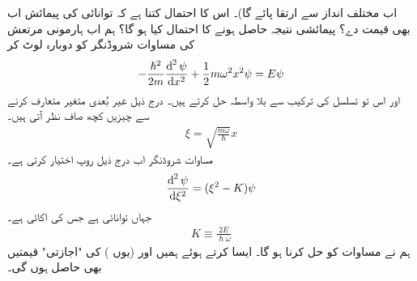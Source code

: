 اب مختلف انداز سے ارتقا پائے گا)۔ اس کا احتمال کتنا ہے کہ توانائی کی پیمائش اب بھی  قیمت دے؟ پیمائشی نتیجہ  حاصل ہونے کا احتمال کیا ہو گا؟
ہم اب ہارمونی مرتعش کی مساوات شروڈنگر کو دوبارہ لوٹ کر
\begin{align}\label{مساوات_شروڈنگر_تحلیلی_حل_الف}
-\frac{\hslash^{2}}{2m}\frac{\dif^{\,2}\psi}{\dif x^{2}}+\frac{1}{2}m\omega^{2}x^{2}\psi=E\psi
\end{align}
اور اس تو تسلسل کی ترکیب سے بلا واسطہ حل کرتے ہیں۔ درج ذیل غیر بُعدی متغیر متعارف کرنے سے چیزیں کچھ صاف نظر آتی ہیں۔
\begin{align}
\xi=\sqrt{\frac{m\omega}{\hslash}}x
\end{align}
مساوات شروڈنگر اب درج ذیل روپ اختیار کرتی ہے۔
\begin{align}\label{مساوات_شروڈنگر_تحلیلی_شروڈنگر}
\frac{\dif^{\,2}\psi}{\dif \xi^{2}}=(\xi^{2}-K)\psi
\end{align}
جہاں  توانائی ہے جس کی اکائی  ہے۔
\begin{align}\label{مساوات_شروڈنگر_تحلیلی_مستقل}
K\equiv \frac{2E}{\hslash\omega}
\end{align}
ہم نے مساوات  کو حل کرنا ہو گا۔ ایسا کرتے ہوئے ہمیں  اور (یوں ) کی "اجازتی" قیمتیں بھی حاصل ہوں گی۔ 

